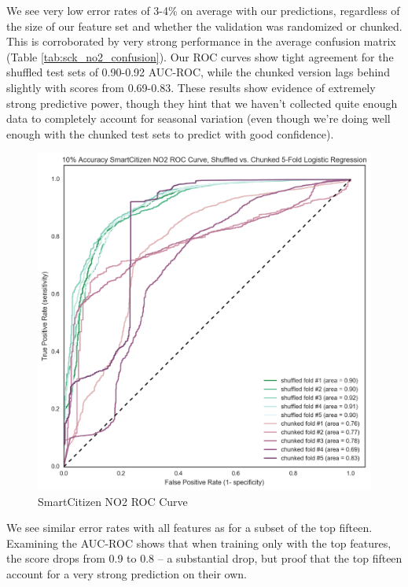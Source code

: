We see very low error rates of 3-4\% on average with our predictions, regardless of the size of our feature set and whether the validation was randomized or chunked.  This is corroborated by very strong performance in the average confusion matrix (Table \ref{tab:sck_no2_confusion}).  Our ROC curves show tight agreement for the shuffled test sets of 0.90-0.92 AUC-ROC, while the chunked version lags behind slightly with scores from 0.69-0.83.  These results show evidence of extremely strong predictive power, though they hint that we haven't collected quite enough data to completely account for seasonal variation (even though we're doing well enough with the chunked test sets to predict with good confidence).

\enlargethispage{10\baselineskip}

\begin{figure}[htb]
 	\includegraphics[width=\textwidth]{figs/sck_no2_10_roc}               
 	 \caption{SmartCitizen NO2 ROC Curve}
  	\label{fig:sck_no2_10_roc}
\end{figure}


We see similar error rates with all features as for a subset of the top fifteen.  Examining the AUC-ROC shows that when training only with the top features, the score drops from 0.9 to 0.8 -- a substantial drop, but proof that the top fifteen account for a very strong prediction on their own.


